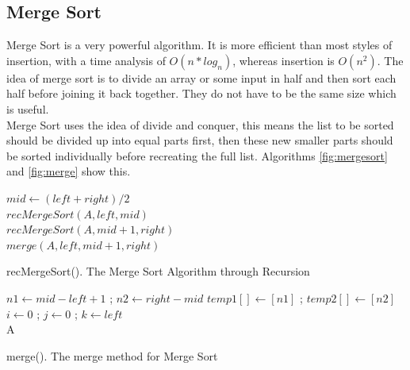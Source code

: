 \documentclass[10pt,twocolumn,hidelinks]{IEEEtran}
\begin{document}

\subsection{Merge Sort}
Merge Sort is a very powerful algorithm. It is more efficient than most styles of insertion, with a time analysis of $O(n * log_{n})$, whereas insertion is $O(n^2)$. The idea of merge sort is to divide an array or some input in half and then sort each half before joining it back together. They do not have to be the same size which is useful.  \\
Merge Sort uses the idea of divide and conquer, this means the list to be sorted should be divided up into equal parts first, then these new smaller parts should be sorted individually before recreating the full list. Algorithms \ref{fig:mergesort} and \ref{fig:merge} show this.
\IncMargin{1em}
\begin{algorithm}
	\LinesNumbered
  	{$mid \longleftarrow (left+right)/2$\\
  	$recMergeSort(A,left,mid)$\\
  	$recMergeSort(A,mid+1,right)$\\
  	$merge(A,left,mid+1,right)$
  	}
\caption{recMergeSort(). The Merge Sort Algorithm through Recursion}
\label{fig:mergesort}
\end{algorithm}\DecMargin{1em}

\IncMargin{1em}
\begin{algorithm}
	\LinesNumbered
 	$n1 \longleftarrow mid - left + 1$ ; $n2 \longleftarrow right - mid$\;
 	$temp1[] \longleftarrow [n1]$  ; $temp2[]\longleftarrow [n2]$\;
	$i \longleftarrow 0$ ; $j \longleftarrow 0$ ; $k \longleftarrow left$\\
	\Return A
\caption{merge(). The merge method for Merge Sort}
\label{fig:merge}
\end{algorithm}\DecMargin{1em}
\end{document}
